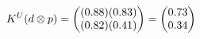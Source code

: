 \documentclass[preview]{standalone}
\begin{document}
\begin{align*}
\special{dvisvgm:raw <g id='unique000'>}K^U(d \otimes p) = \begin{pmatrix} (0.88)(0.83) \\ (0.82)(0.41) \end{pmatrix} = \begin{pmatrix} 0.73 \\ 0.34 \end{pmatrix}\special{dvisvgm:raw </g>}
\end{align*}
\end{document}
